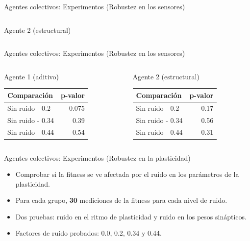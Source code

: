 \documentclass[aspectratio=169]{beamer}
\begin{document}
\begin{frame}{Agentes colectivos: Experimentos (Robustez en los sensores)}
\begin{columns}
\begin{column}{0.5\textwidth}
\begin{block}{Agente 2 (estructural)}
      \end{block}
    \end{column}
  \end{columns}
\end{frame}

\begin{frame}{Agentes colectivos: Experimentos (Robustez en los sensores)}
  \begin{columns}
    \begin{column}{0.47\textwidth}
      \begin{block}{Agente 1 (aditivo)}
        \begin{table}
         \begin{tabular}{lr}
           \toprule
           Comparación & p-valor\\
           \midrule
           Sin ruido - 0.2 & 0.075\\
           Sin ruido - 0.34 & 0.39\\
           Sin ruido - 0.44 & 0.54\\
           \bottomrule
         \end{tabular}
       \end{table}
    \end{block}
    \end{column}
    \begin{column}{0.5\textwidth}
      \begin{block}{Agente 2 (estructural)}
        \begin{table}
         \begin{tabular}{lr}
           \toprule
           Comparación & p-valor\\
           \midrule
           Sin ruido - 0.2 & 0.17\\
           Sin ruido - 0.34 & 0.56\\
           Sin ruido - 0.44 & 0.31\\
           \bottomrule
         \end{tabular}
       \end{table}
      \end{block}
    \end{column}
  \end{columns}
\end{frame}


\begin{frame}{Agentes colectivos: Experimentos (Robustez en la plasticidad)}
  \begin{itemize}
    \item Comprobar si la fitness se ve afectada por el ruido en los parámetros de la plasticidad.
    \item Para cada grupo, \textbf{30} mediciones de la fitness para cada nivel de ruido.
    \item Dos pruebas: ruido en el ritmo de plasticidad y ruido en los pesos sinápticos.
    \item Factores de ruido probados: 0.0, 0.2, 0.34 y 0.44.
  \end{itemize}
\end{frame}
\end{document}
